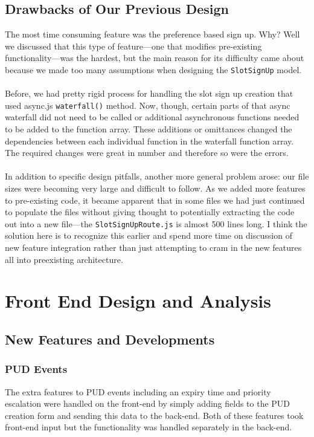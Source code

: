 \documentclass[11pt]{article}   %
\begin{document}
\subsection{Drawbacks of Our Previous Design}
The most time consuming feature was the preference based sign up. Why? Well we discussed that this type of feature---one that modifies pre-existing functionality---was the hardest, but the main reason for its difficulty came about because we made too many assumptions when designing the \texttt{SlotSignUp} model.\\~\\
Before, we had pretty rigid process for handling the slot sign up creation that used async.js \texttt{waterfall()} method. Now, though, certain parts of that async waterfall did not need to be called or additional asynchronous functions needed to be added to the function array. These additions or omittances changed the dependencies between each individual function in the waterfall function array. The required changes were great in number and therefore so were the errors. \\~\\
In addition to specific design pitfalls, another more general problem arose: our file sizes were becoming very large and difficult to follow. As we added more features to pre-existing code, it became apparent that in some files we had just continued to populate the files without giving thought to potentially extracting the code out into a new file---the \texttt{SlotSignUpRoute.js} is almost 500 lines long. I think the solution here is to recognize this earlier and spend more time on discussion of new feature integration rather than just attempting to cram in the new features all into preexisting architecture. 

\section{Front End Design and Analysis}

\subsection{New Features and Developments}

\subsubsection{PUD Events}

The extra features to PUD events including an expiry time and priority escalation were handled on the front-end by simply adding fields to the PUD creation form and sending this data to the back-end. Both of these features  took front-end input but the functionality was handled separately in the back-end.
\end{document}
